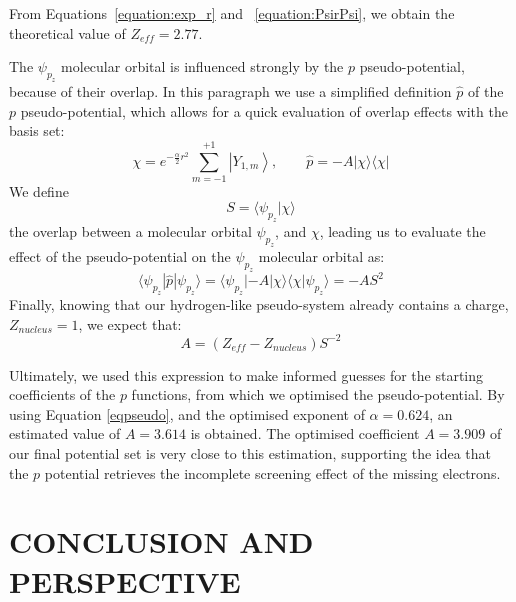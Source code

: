 \documentclass[12pt]{article}
\begin{document}
From Equations~\ref{equation:exp_r} and ~\ref{equation:PsirPsi}, we obtain the theoretical value of \(Z_{eff} = 2.77\).

The \(\psi_{p_{z}}\) molecular orbital is influenced strongly by the $p$ pseudo-potential,
because of their overlap. In this paragraph we use a simplified definition $\widehat{p}$ of the $p$ pseudo-potential, which allows for a quick evaluation of overlap effects with the basis set: 
\begin{equation}
\chi = e^{-\frac{\alpha}{2} r^{2}}\sum_{m=-1}^{+1}\left|Y_{1,m}\right>,\qquad \widehat{p} = -A | \chi \rangle \langle \chi |
\end{equation}
We define
\begin{equation}
S = \langle \psi_{p_{z}} | \chi \rangle
\end{equation}
the overlap between a molecular orbital \(\psi_{p_{z}}\), and \(\chi\),
leading us to evaluate the effect of the pseudo-potential on the \(\psi_{p_{z}}\) molecular orbital as:
\begin{equation}
\langle \psi_{p_{z}} | \widehat{p} | \psi_{p_{z}} \rangle = \langle \psi_{p_{z}} | -A | \chi \rangle \langle \chi | \psi_{p_{z}} \rangle = -A S^{2}
\end{equation}
Finally, knowing that our hydrogen-like pseudo-system already contains a charge, \(Z_{nucleus}=1\), 
we expect that:
\begin{equation}
A = (Z_{eff} - Z_{nucleus})S^{-2}
\label{eqpseudo}
\end{equation}

Ultimately, we used this expression to make informed guesses for the starting coefficients of the $p$ functions, from which we optimised the pseudo-potential.
By using Equation \ref{eqpseudo}, and the optimised exponent of $\alpha=0.624$, an estimated value of $A=3.614$ is obtained.  
The optimised coefficient $A=3.909$ of our final potential set is very close to this estimation, 
supporting the idea that the $p$ potential retrieves the incomplete screening effect of the missing electrons. 

\section*{\sffamily \Large CONCLUSION AND PERSPECTIVE}
\end{document}
